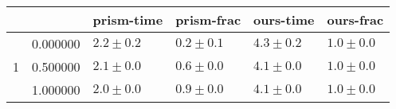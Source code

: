 \begin{tabular}{llllll}
\toprule
 &  & prism-time & prism-frac & ours-time & ours-frac \\
\midrule
\multirow[t]{3}{*}{1} & 0.000000 & $2.2 \pm 0.2$ & $0.2 \pm 0.1$ & $4.3 \pm 0.2$ & $1.0 \pm 0.0$ \\
 & 0.500000 & $2.1 \pm 0.0$ & $0.6 \pm 0.0$ & $4.1 \pm 0.0$ & $1.0 \pm 0.0$ \\
 & 1.000000 & $2.0 \pm 0.0$ & $0.9 \pm 0.0$ & $4.1 \pm 0.0$ & $1.0 \pm 0.0$ \\
\cline{1-6}
\bottomrule
\end{tabular}

